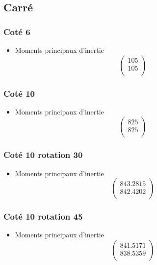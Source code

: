 \documentclass[a4paper,12pt]{report}
\begin{document}
\subsection*{Carré}

\subsubsection*{Coté 6}
\begin{itemize}
\item Moments principaux d'inertie
\[
   \left (
   \begin{array}{c}
      105 \\
      105 \\
   \end{array}
   \right )
\]
\end{itemize}

\subsubsection*{Coté 10}
\begin{itemize}
\item Moments principaux d'inertie
\[
   \left (
   \begin{array}{c}
      825 \\
      825 \\
   \end{array}
   \right )
\]
\end{itemize}

\subsubsection*{Coté 10 rotation 30}
\begin{itemize}
\item Moments principaux d'inertie
\[
   \left (
   \begin{array}{c}
      843.2815 \\
      842.4202 \\
   \end{array}
   \right )
\]
\end{itemize}

\subsubsection*{Coté 10 rotation 45}
\begin{itemize}
\item Moments principaux d'inertie
\[
   \left (
   \begin{array}{c}
      841.5171 \\
      838.5359 \\
   \end{array}
   \right )
\]
\end{itemize}
\end{document}
